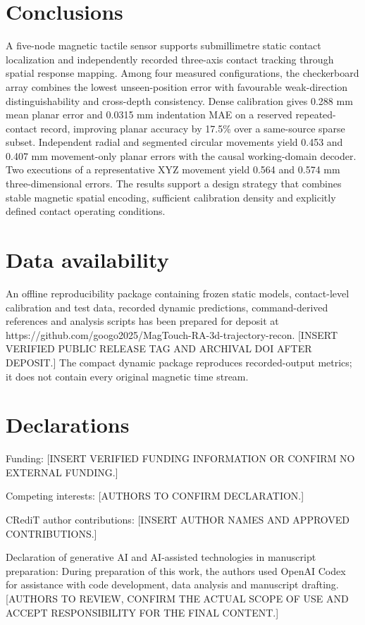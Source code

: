 \documentclass[preprint,12pt]{elsarticle}
\begin{document}
\section{Conclusions}

A five-node magnetic tactile sensor supports submillimetre static contact localization and independently recorded three-axis contact tracking through spatial response mapping. Among four measured configurations, the checkerboard array combines the lowest unseen-position error with favourable weak-direction distinguishability and cross-depth consistency. Dense calibration gives 0.288 mm mean planar error and 0.0315 mm indentation MAE on a reserved repeated-contact record, improving planar accuracy by 17.5\% over a same-source sparse subset. Independent radial and segmented circular movements yield 0.453 and 0.407 mm movement-only planar errors with the causal working-domain decoder. Two executions of a representative XYZ movement yield 0.564 and 0.574 mm three-dimensional errors. The results support a design strategy that combines stable magnetic spatial encoding, sufficient calibration density and explicitly defined contact operating conditions.

\section{Data availability}

An offline reproducibility package containing frozen static models, contact-level calibration and test data, recorded dynamic predictions, command-derived references and analysis scripts has been prepared for deposit at https://github.com/googo2025/MagTouch-RA-3d-trajectory-recon. [INSERT VERIFIED PUBLIC RELEASE TAG AND ARCHIVAL DOI AFTER DEPOSIT.] The compact dynamic package reproduces recorded-output metrics; it does not contain every original magnetic time stream.

\section{Declarations}

Funding: [INSERT VERIFIED FUNDING INFORMATION OR CONFIRM NO EXTERNAL FUNDING.]

Competing interests: [AUTHORS TO CONFIRM DECLARATION.]

CRediT author contributions: [INSERT AUTHOR NAMES AND APPROVED CONTRIBUTIONS.]

Declaration of generative AI and AI-assisted technologies in manuscript preparation: During preparation of this work, the authors used OpenAI Codex for assistance with code development, data analysis and manuscript drafting. [AUTHORS TO REVIEW, CONFIRM THE ACTUAL SCOPE OF USE AND ACCEPT RESPONSIBILITY FOR THE FINAL CONTENT.]
\end{document}
